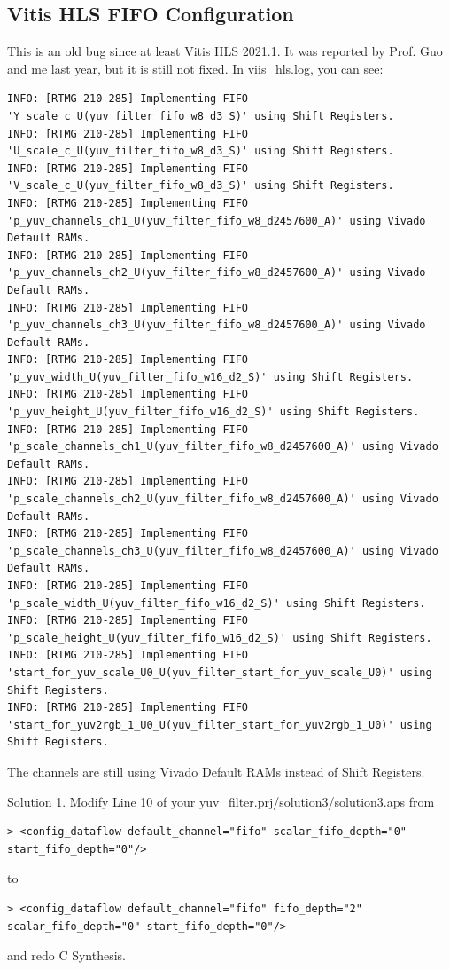 \documentclass[a4paper,12pt,twoside]{article}
\begin{document}
\subsection{Vitis HLS FIFO Configuration}\label{AFifo}
This is an old bug since at least Vitis HLS 2021.1. It was reported by Prof. Guo and me last year, but it is still not fixed. In viis\_hls.log, you can see:
\begin{verbatim}
INFO: [RTMG 210-285] Implementing FIFO 'Y_scale_c_U(yuv_filter_fifo_w8_d3_S)' using Shift Registers.
INFO: [RTMG 210-285] Implementing FIFO 'U_scale_c_U(yuv_filter_fifo_w8_d3_S)' using Shift Registers.
INFO: [RTMG 210-285] Implementing FIFO 'V_scale_c_U(yuv_filter_fifo_w8_d3_S)' using Shift Registers.
INFO: [RTMG 210-285] Implementing FIFO 'p_yuv_channels_ch1_U(yuv_filter_fifo_w8_d2457600_A)' using Vivado Default RAMs.
INFO: [RTMG 210-285] Implementing FIFO 'p_yuv_channels_ch2_U(yuv_filter_fifo_w8_d2457600_A)' using Vivado Default RAMs.
INFO: [RTMG 210-285] Implementing FIFO 'p_yuv_channels_ch3_U(yuv_filter_fifo_w8_d2457600_A)' using Vivado Default RAMs.
INFO: [RTMG 210-285] Implementing FIFO 'p_yuv_width_U(yuv_filter_fifo_w16_d2_S)' using Shift Registers.
INFO: [RTMG 210-285] Implementing FIFO 'p_yuv_height_U(yuv_filter_fifo_w16_d2_S)' using Shift Registers.
INFO: [RTMG 210-285] Implementing FIFO 'p_scale_channels_ch1_U(yuv_filter_fifo_w8_d2457600_A)' using Vivado Default RAMs.
INFO: [RTMG 210-285] Implementing FIFO 'p_scale_channels_ch2_U(yuv_filter_fifo_w8_d2457600_A)' using Vivado Default RAMs.
INFO: [RTMG 210-285] Implementing FIFO 'p_scale_channels_ch3_U(yuv_filter_fifo_w8_d2457600_A)' using Vivado Default RAMs.
INFO: [RTMG 210-285] Implementing FIFO 'p_scale_width_U(yuv_filter_fifo_w16_d2_S)' using Shift Registers.
INFO: [RTMG 210-285] Implementing FIFO 'p_scale_height_U(yuv_filter_fifo_w16_d2_S)' using Shift Registers.
INFO: [RTMG 210-285] Implementing FIFO 'start_for_yuv_scale_U0_U(yuv_filter_start_for_yuv_scale_U0)' using Shift Registers.
INFO: [RTMG 210-285] Implementing FIFO 'start_for_yuv2rgb_1_U0_U(yuv_filter_start_for_yuv2rgb_1_U0)' using Shift Registers.
\end{verbatim}
The channels are still using Vivado Default RAMs instead of Shift Registers.

Solution 1. Modify Line 10 of your yuv\_filter.prj/solution3/solution3.aps from
\begin{verbatim}
> <config_dataflow default_channel="fifo" scalar_fifo_depth="0" start_fifo_depth="0"/>
\end{verbatim}
to
\begin{verbatim}
> <config_dataflow default_channel="fifo" fifo_depth="2" scalar_fifo_depth="0" start_fifo_depth="0"/>
\end{verbatim}
and redo C Synthesis.
\end{document}
